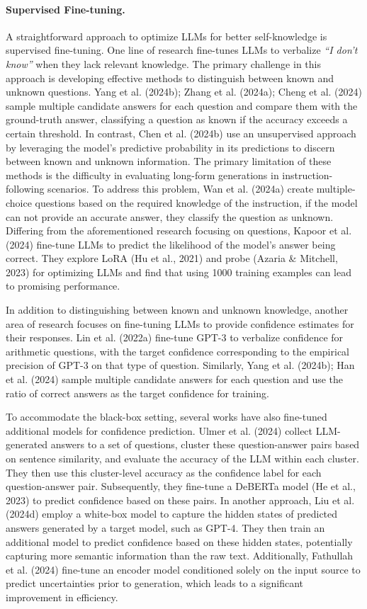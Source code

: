 \paragraph{Supervised Fine-tuning.} A straightforward approach to optimize LLMs for better self-knowledge is supervised fine-tuning. One line of research fine-tunes LLMs to verbalize \emph{``I don't know''} when they lack relevant knowledge. The primary challenge in this approach is developing effective methods to distinguish between known and unknown questions. Yang et al. (2024b); Zhang et al. (2024a); Cheng et al. (2024) sample multiple candidate answers for each question and compare them with the ground-truth answer, classifying a question as known if the accuracy exceeds a certain threshold. In contrast, Chen et al. (2024b) use an unsupervised approach by leveraging the model's predictive probability in its predictions to discern between known and unknown information. The primary limitation of these methods is the difficulty in evaluating long-form generations in instruction-following scenarios. To address this problem, Wan et al. (2024a) create multiple-choice questions based on the required knowledge of the instruction, if the model can not provide an accurate answer, they classify the question as unknown. Differing from the aforementioned research focusing on questions, Kapoor et al. (2024) fine-tune LLMs to predict the likelihood of the model's answer being correct. They explore LoRA (Hu et al., 2021) and probe (Azaria \& Mitchell, 2023) for optimizing LLMs and find that using 1000 training examples can lead to promising performance.

In addition to distinguishing between known and unknown knowledge, another area of research focuses on fine-tuning LLMs to provide confidence estimates for their responses. Lin et al. (2022a) fine-tune GPT-3 to verbalize confidence for arithmetic questions, with the target confidence corresponding to the empirical precision of GPT-3 on that type of question. Similarly, Yang et al. (2024b); Han et al. (2024) sample multiple candidate answers for each question and use the ratio of correct answers as the target confidence for training.

To accommodate the black-box setting, several works have also fine-tuned additional models for confidence prediction. Ulmer et al. (2024) collect LLM-generated answers to a set of questions, cluster these question-answer pairs based on sentence similarity, and evaluate the accuracy of the LLM within each cluster. They then use this cluster-level accuracy as the confidence label for each question-answer pair. Subsequently, they fine-tune a DeBERTa model (He et al., 2023) to predict confidence based on these pairs. In another approach, Liu et al. (2024d) employ a white-box model to capture the hidden states of predicted answers generated by a target model, such as GPT-4. They then train an additional model to predict confidence based on these hidden states, potentially capturing more semantic information than the raw text. Additionally, Fathullah et al. (2024) fine-tune an encoder model conditioned solely on the input source to predict uncertainties prior to generation, which leads to a significant improvement in efficiency.

